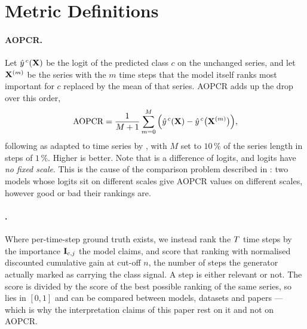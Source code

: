 %

\section{Metric Definitions}
\label{app:metrics}

\paragraph{AOPCR.}
Let $\hat{y}^{\,c}(\mathbf{X})$ be the logit of the predicted class $c$ on the unchanged series, and let
$\mathbf{X}^{(m)}$ be the series with the $m$ time steps that the model itself ranks most important for $c$
replaced by the mean of that series. AOPCR adds up the drop over this order,
\begin{equation}
  \mathrm{AOPCR} = \frac{1}{M+1}\sum_{m=0}^{M}
      \Big( \hat{y}^{\,c}(\mathbf{X}) - \hat{y}^{\,c}\big(\mathbf{X}^{(m)}\big) \Big),
  \label{eq:aopc}
\end{equation}
following \citet{samek2017aopc} as adapted to time series by \citet{early2024millet}, with $M$ set to
$10\,\%$ of the series length in steps of $1\,\%$. Higher is better. Note that  is a
difference of logits, and logits have \emph{no fixed scale}. This is the cause of the comparison
problem described in : two models whose logits sit on different scales give AOPCR
values on different scales, however good or bad their rankings are.

\paragraph{\ndcg{}.}
Where per-time-step ground truth exists, we instead rank the $T$ time steps by the importance
$\mathbf{I}_{c,j}$ the model claims, and score that ranking with normalised discounted cumulative gain
\citep{jarvelin2002ndcg} at cut-off $n$, the number of steps the generator actually marked as
carrying the class signal. A step is either relevant or not. The score is divided by the score of the
best possible ranking of the same series, so \ndcg{} lies in $[0,1]$ and can be compared between
models, datasets and papers --- which is why the interpretation claims of this paper rest on it and
not on AOPCR.

